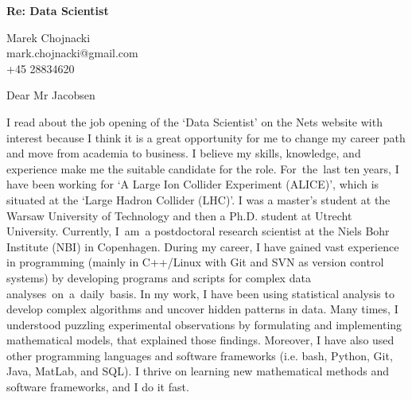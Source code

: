 \documentclass[a4paper,11pt]{letter}
\date{}
\begin{document}
\begin{letter}{\bf{Re: Data Scientist}}
\address{Nets \\Fraud Issuing \& \\Dispute Centre Of Excellence}

\begin{flushleft}
Marek Chojnacki \\ %
mark.chojnacki@gmail.com \\
+45 28834620
\end{flushleft}
\opening{Dear Mr Jacobsen}
I read about the job opening of the `Data Scientist' on the Nets website with interest
because I think it is a great opportunity for me to change my career path and move from academia to business.
I believe my skills, knowledge, and experience make me the suitable candidate for the role.
\vspace{0.15cm}	
\newline
For the last ten years, I have been working for `A Large Ion Collider Experiment (ALICE)', which is situated at the `Large Hadron Collider (LHC)'.
I was a master's student at the Warsaw University of Technology and then a Ph.D. student at Utrecht University. 
Currently, \mbox{I am} a postdoctoral research scientist at the Niels Bohr Institute (NBI) in Copenhagen.
\vspace{0.15cm}	
\newline
During my career, I have gained vast experience in programming (mainly in C++/Linux with Git and SVN as version control systems) 
by developing programs and scripts for complex data analyses on a daily basis.
In my work, I have been using statistical analysis to develop complex algorithms and uncover hidden patterns in data.
Many times, I understood puzzling experimental observations by formulating and implementing mathematical models, that explained those findings.
Moreover, I have also used other programming languages and software frameworks (i.e. bash, Python, Git, Java, MatLab, and SQL). 
I thrive on learning new mathematical methods and software frameworks, and I do it fast.
\vspace{0.15cm}

\end{letter}
\end{document}
